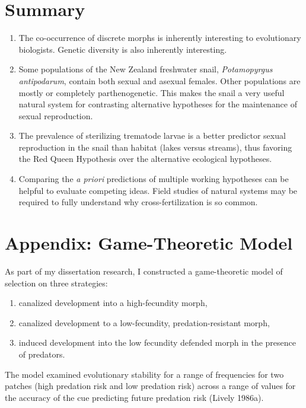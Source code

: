 \documentclass[
  letterpaper,
]{book}
\begin{document}
\section{Summary}\label{summary-2}

\begin{enumerate}
\def\labelenumi{\arabic{enumi}.}
\item
  The co-occurrence of discrete morphs is inherently interesting to
  evolutionary biologists. Genetic diversity is also inherently
  interesting.
\item
  Some populations of the New Zealand freshwater snail,
  \emph{Potamopyrgus antipodarum}, contain both sexual and asexual
  females. Other populations are mostly or completely parthenogenetic.
  This makes the snail a very useful natural system for contrasting
  alternative hypotheses for the maintenance of sexual reproduction.
\item
  The prevalence of sterilizing trematode larvae is a better predictor
  sexual reproduction in the snail than habitat (lakes versus streams),
  thus favoring the Red Queen Hypothesis over the alternative ecological
  hypotheses.
\item
  Comparing the \emph{a priori} predictions of multiple working
  hypotheses can be helpful to evaluate competing ideas. Field studies
  of natural systems may be required to fully understand why
  cross-fertilization is so common.
\end{enumerate}

\section{Appendix: Game-Theoretic Model}\label{sec-app-3}

As part of my dissertation research, I constructed a game-theoretic
model of selection on three strategies:

\begin{enumerate}
\def\labelenumi{\arabic{enumi}.}
\item
  canalized development into a high-fecundity morph,
\item
  canalized development to a low-fecundity, predation-resistant morph,
\item
  induced development into the low fecundity defended morph in the
  presence of predators.
\end{enumerate}

The model examined evolutionary stability for a range of frequencies for
two patches (high predation risk and low predation risk) across a range
of values for the accuracy of the cue predicting future predation risk
(Lively 1986a).
\end{document}
